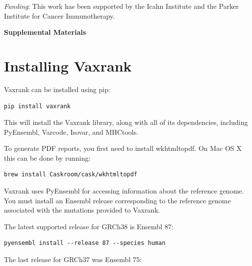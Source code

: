 \documentclass[10pt,letterpaper]{article}
\begin{document}
{\it Funding}: This work has been supported by the Icahn Institute and the Parker Institute for Cancer Immunotherapy.





\pagebreak

\begin{center}
	\textbf{\large Supplemental Materials}
\end{center}

\setcounter{equation}{0}
\setcounter{figure}{0}
\setcounter{table}{0}
\setcounter{page}{1}
\makeatletter
\renewcommand{\theequation}{S\arabic{equation}}
\renewcommand{\thefigure}{S\arabic{figure}}
\renewcommand{\bibnumfmt}[1]{[S#1]}
\renewcommand{\citenumfont}[1]{S#1}

\section*{Installing Vaxrank}
Vaxrank can be installed using pip:

\begin{verbatim}
pip install vaxrank
\end{verbatim}

This will install the Vaxrank library, along with all of its dependencies, including PyEnsembl, Varcode, Isovar, and MHCtools. 

To generate PDF reports, you first need to install wkhtmltopdf. On Mac OS X this can be done by running: 
\begin{verbatim}
brew install Caskroom/cask/wkhtmltopdf
\end{verbatim}

Vaxrank uses PyEnsembl for accessing information about the reference genome. You must install an Ensembl release corresponding to the reference genome associated with the mutations provided to Vaxrank.

The latest supported release for GRCh38 is Ensembl 87:
\begin{verbatim}
pyensembl install --release 87 --species human
\end{verbatim}

The last release for GRCh37 was Ensembl 75:
\end{document}
